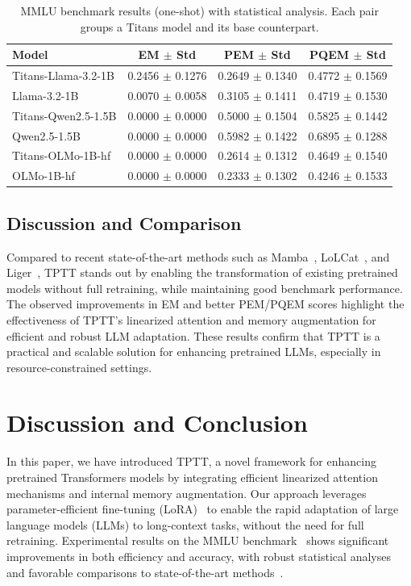 \documentclass[10pt,a4paper]{article}
\begin{document}
\begin{table}[h!]
    \centering
    \renewcommand{\arraystretch}{1.2}
    \begin{tabular}{|l|c|c|c|}
    \hline
    Model & EM $\pm$ Std & PEM $\pm$ Std & PQEM $\pm$ Std \\
    \hline
    Titans-Llama-3.2-1B & 0.2456 $\pm$ 0.1276 & 0.2649 $\pm$ 0.1340 & 0.4772 $\pm$ 0.1569 \\
    Llama-3.2-1B        & 0.0070 $\pm$ 0.0058 & 0.3105 $\pm$ 0.1411 & 0.4719 $\pm$ 0.1530 \\
    \hline
    Titans-Qwen2.5-1.5B & 0.0000 $\pm$ 0.0000 & 0.5000 $\pm$ 0.1504 & 0.5825 $\pm$ 0.1442 \\
    Qwen2.5-1.5B        & 0.0000 $\pm$ 0.0000 & 0.5982 $\pm$ 0.1422 & 0.6895 $\pm$ 0.1288 \\
    \hline
    Titans-OLMo-1B-hf   & 0.0000 $\pm$ 0.0000 & 0.2614 $\pm$ 0.1312 & 0.4649 $\pm$ 0.1540 \\
    OLMo-1B-hf          & 0.0000 $\pm$ 0.0000 & 0.2333 $\pm$ 0.1302 & 0.4246 $\pm$ 0.1533 \\
    \hline
    \end{tabular}
    \caption{MMLU benchmark results (one-shot) with statistical analysis. Each pair groups a Titans model and its base counterpart.}
    \label{tab:mmlu-results}
    \end{table}


\subsection{Discussion and Comparison}

Compared to recent state-of-the-art methods such as Mamba~\cite{gu2023mamba}, LoLCat~\cite{zhang2024lolcats}, and Liger~\cite{lan2025liger}, TPTT stands out by enabling the transformation of existing pretrained models without full retraining, while maintaining good benchmark performance. The observed improvements in EM and better PEM/PQEM scores highlight the effectiveness of TPTT's linearized attention and memory augmentation for efficient and robust LLM adaptation. These results confirm that TPTT is a practical and scalable solution for enhancing pretrained LLMs, especially in resource-constrained settings.


\section{Discussion and Conclusion}

In this paper, we have introduced TPTT, a novel framework for enhancing pretrained Transformers models by integrating efficient linearized attention mechanisms and internal memory augmentation. Our approach leverages parameter-efficient fine-tuning (LoRA)~\cite{hu2022lora} to enable the rapid adaptation of large language models (LLMs) to long-context tasks, without the need for full retraining. Experimental results on the MMLU benchmark~\cite{hendrycks2020measuring} shows significant improvements in both efficiency and accuracy, with robust statistical analyses and favorable comparisons to state-of-the-art methods~\cite{gu2023mamba, zhang2024lolcats, lan2025liger}.
\end{document}
